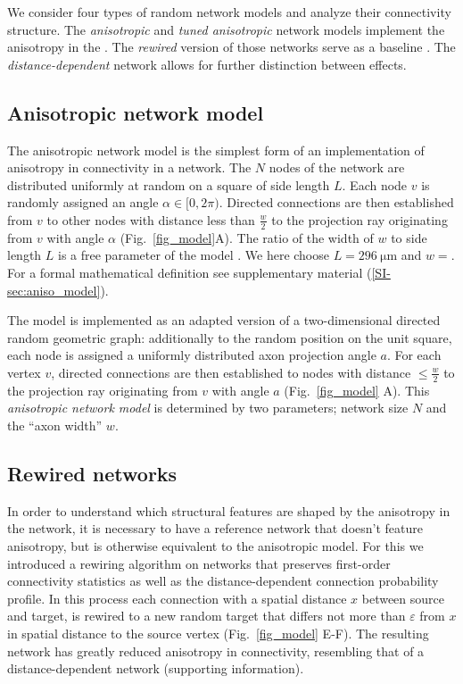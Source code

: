 
We consider four types of random network models and analyze their
connectivity structure. The \textit{anisotropic} and \textit{tuned
anisotropic} network models implement the anisotropy in the
. The \textit{rewired} version of those networks serve as a baseline
. The \textit{distance-dependent} network allows for further
distinction between effects.

\subsection*{Anisotropic network model}

The anisotropic network model is the simplest form of an
implementation of anisotropy in connectivity in a network. The $N$
nodes of the network are distributed uniformly at random on a square
of side length $L$. Each node $v$ is randomly assigned an angle
$\alpha \in [0,2\pi)$. Directed connections are then established from
$v$ to other nodes with distance less than $\frac{w}{2}$ to the
projection ray originating from $v$ with angle $\alpha$
(Fig.~\ref{fig_model}A). The ratio of the width of $w$ to side length
$L$ is a free parameter of the model . We here choose
$L=\SI{296}{\micro\meter}$ and $w=$. For a formal mathematical definition see supplementary material (\ref{SI-sec:aniso_model}).

The model is implemented as an adapted version of a two-dimensional
directed random geometric graph: additionally to the random position
on the unit square, each node is assigned a uniformly distributed axon
projection angle $a$. For each vertex $v$, directed connections are
then established to nodes with distance $\leq \frac{w}{2}$ to the
projection ray originating from $v$ with angle $a$
(Fig.~\ref{fig_model} A). This \textit{anisotropic network
  model} is determined by two parameters; network size $N$ and the
\enquote{axon width} $w$.




\subsection*{Rewired networks}
%
In order to understand which structural features are shaped by the
anisotropy in the network, it is necessary to have a reference network
that doesn't feature anisotropy, but is otherwise equivalent to the
anisotropic model. For this we introduced a rewiring algorithm on
networks that preserves first-order connectivity statistics %
as well as the distance-dependent connection probability profile. In
this process each connection with a spatial distance $x$ between
source and target, is rewired to a new random target that differs not
more than $\varepsilon$ from $x$ in spatial distance to the source
vertex (Fig.~\ref{fig_model} E-F). The resulting network has greatly
reduced anisotropy in connectivity, resembling that of a
distance-dependent network (supporting information).

